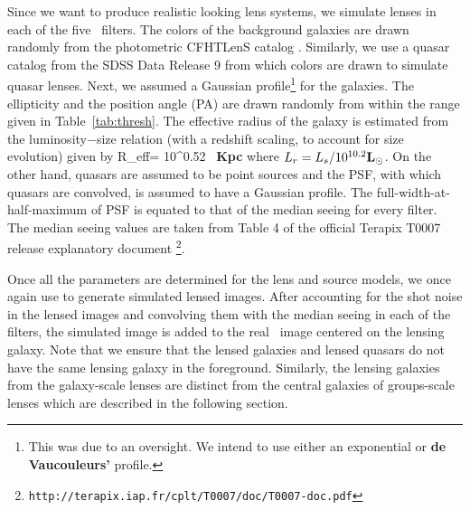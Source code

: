 \documentclass[useAMS,usenatbib,a4paper]{mn2e}
\begin{document}
Since we want to produce realistic looking lens systems, we simulate
lenses in each of the five \cfhtls~filters. The colors of the background
galaxies are drawn randomly from the photometric CFHTLenS catalog
\citep{Hildebrandt2012,Erben2013}.  Similarly, we use a quasar catalog
from the SDSS Data Release 9 \citep{Paris2012} from which colors are
drawn to simulate quasar lenses. Next, we assumed a Gaussian
profile\footnote{This was due to an oversight. We intend to use either
an exponential or {\bf de Vaucouleurs'} profile.} for
the galaxies. The ellipticity and the position angle (PA) are drawn
randomly from within the range given in Table~\ref{tab:thresh}. The
effective radius of the galaxy is estimated from the luminosity$-$size
relation \citep{Bernardi2003} (with a redshift scaling, to account for
size evolution) given by
\be
R_{\rm eff}= 10^{0.52}  \, {\bf Kpc}
\ee
where $L_r=L_s/10^{10.2} {\bf L_\odot}$. On the other hand, quasars are assumed to be
point sources and the PSF, with which quasars are convolved, is assumed
to have a Gaussian profile. The full-width-at-half-maximum of PSF is
equated to that of the median seeing for every filter. The median seeing
values are taken from Table 4 of the official Terapix T0007 release
explanatory document \footnote{
\texttt{http://terapix.iap.fr/cplt/T0007/doc/T0007-doc.pdf}}.

Once all the parameters are determined for the lens and source models, we once
again use \gravlens to generate simulated lensed images.  After accounting for the shot
noise in the lensed images and convolving them with the median seeing in each of
the filters, the simulated image is added to the real \cfhtls~image centered
on the lensing galaxy. Note that we ensure that the lensed galaxies and
lensed quasars do not have the same lensing galaxy in the foreground. Similarly,
the lensing galaxies from the galaxy-scale lenses are distinct from the central
galaxies of groups-scale lenses which are described in the following section.
\end{document}
